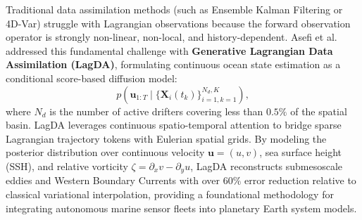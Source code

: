 Traditional data assimilation methods (such as Ensemble Kalman Filtering or 4D-Var) struggle with Lagrangian observations because the forward observation operator is strongly non-linear, non-local, and history-dependent. Asefi et al.~\cite{asefi2025lagrangian} addressed this fundamental challenge with \textbf{Generative Lagrangian Data Assimilation (LagDA)}, formulating continuous ocean state estimation as a conditional score-based diffusion model:
\begin{equation}
    p(\mathbf{u}_{1:T} \mid \{\mathbf{X}_i(t_k)\}_{i=1, k=1}^{N_d, K}),
\end{equation}
where $N_d$ is the number of active drifters covering less than $0.5\%$ of the spatial basin. LagDA leverages continuous spatio-temporal attention to bridge sparse Lagrangian trajectory tokens with Eulerian spatial grids. By modeling the posterior distribution over continuous velocity $\mathbf{u} = (u, v)$, sea surface height (SSH), and relative vorticity $\zeta = \partial_x v - \partial_y u$, LagDA reconstructs submesoscale eddies and Western Boundary Currents with over $60\%$ error reduction relative to classical variational interpolation, providing a foundational methodology for integrating autonomous marine sensor fleets into planetary Earth system models.

